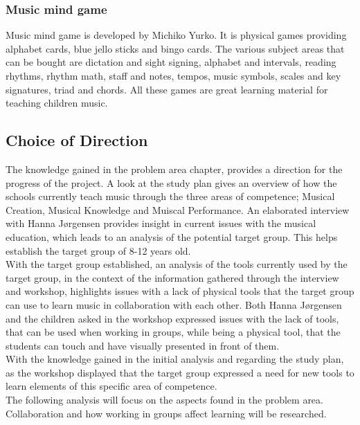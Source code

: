 \subsubsection{Music mind game}
Music mind game is developed by Michiko Yurko. It is physical games providing alphabet cards, blue jello sticks and bingo cards. The various subject areas that can be bought are dictation and sight signing, alphabet and intervals, reading rhythms, rhythm math, staff and notes, tempos, music symbols, scales and key signatures, triad and chords. All these games are great learning material for teaching children music. \cite{Musicmindgames}

  
\subsection{Choice of Direction}
The knowledge gained in the problem area chapter, provides a direction for the progress of the project. A look at the study plan gives an overview of how the schools currently teach music through the three areas of competence; Musical Creation, Musical Knowledge and Muiscal Performance. An elaborated interview with Hanna Jørgensen provides insight in current issues with the musical education, which leads to an analysis of the potential target group. This helps establish the target group of 8-12 years old.\\

With the target group established, an analysis of the tools currently used by the target group, in the context of the information gathered through the interview and workshop, highlights issues with a lack of physical tools that the target group can use to learn music in collaboration with each other. Both Hanna Jørgensen and the children asked in the workshop expressed issues with the lack of tools, that can be used when working in groups, while being a physical tool, that the students can touch and have visually presented in front of them.\\

With the knowledge gained in the initial analysis and regarding the study plan, as the workshop displayed that the target group expressed a need for new tools to learn elements of this specific area of competence.\\

The following analysis will focus on the aspects found in the problem area. Collaboration and how working in groups affect learning will be researched.\\

